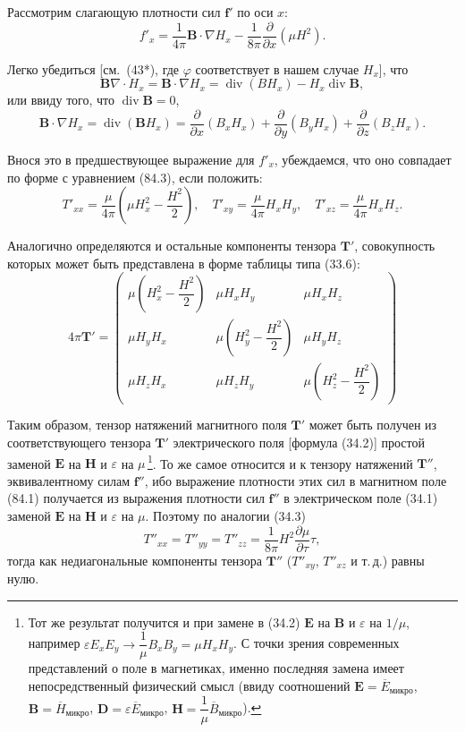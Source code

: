 \documentclass[a4paper,12pt]{article}
\begin{document}
Рассмотрим слагающую плотности сил $\mathbf{f}'$ по оси $x$:
$$
    f'_x = \frac{1}{4\pi}\mathbf{B}\cdot\nabla H_x
         - \frac{1}{8\pi}\frac{\partial}{\partial x}(\mu H^2).
$$

Легко убедиться [см.\ (43*), где $\varphi$ соответствует в нашем случае
$H_x$], что
$$
    \mathbf{B}\nabla\cdot H_x = \mathbf{B}\cdot\nabla H_x
    = \operatorname{div}(BH_x) - H_x\operatorname{div}\mathbf{B},
$$
или ввиду того, что $\operatorname{div}\mathbf{B} = 0$,
$$
    \mathbf{B}\cdot\nabla H_x
    = \operatorname{div}(\mathbf{B}H_x)
    = \frac{\partial}{\partial x}(B_x H_x)
    + \frac{\partial}{\partial y}(B_y H_x)
    + \frac{\partial}{\partial z}(B_z H_x).
$$

Внося это в предшествующее выражение для $f'_x$, убеждаемся, что
оно совпадает по форме с уравнением (84.3), если положить:
$$
    T'_{xx} = \frac{\mu}{4\pi}\!\left(\mu H_x^2 - \frac{H^2}{2}\right),
    \quad
    T'_{xy} = \frac{\mu}{4\pi}H_x H_y,
    \quad
    T'_{xz} = \frac{\mu}{4\pi}H_x H_z.
$$

Аналогично определяются и остальные компоненты тензора $\mathbf{T}'$,
совокупность которых может быть представлена в форме таблицы типа (33.6):
\begin{equation}
    4\pi\mathbf{T}' = \begin{pmatrix}
        \mu\!\left(H_x^2 - \dfrac{H^2}{2}\right) & \mu H_x H_y & \mu H_x H_z \\
        \mu H_y H_x & \mu\!\left(H_y^2 - \dfrac{H^2}{2}\right) & \mu H_y H_z \\
        \mu H_z H_x & \mu H_z H_y & \mu\!\left(H_z^2 - \dfrac{H^2}{2}\right)
    \end{pmatrix}
    \tag{84.4}
\end{equation}


Таким образом, тензор натяжений магнитного поля $\mathbf{T}'$ может быть
получен из соответствующего тензора $\mathbf{T}'$ электрического поля
[формула (34.2)] простой заменой $\mathbf{E}$ на $\mathbf{H}$ и
$\varepsilon$ на $\mu$\,\footnote{Тот же результат получится и при замене
в (34.2) $\mathbf{E}$ на $\mathbf{B}$ и $\varepsilon$ на $1/\mu$,
например $\varepsilon E_x E_y \to \dfrac{1}{\mu}B_x B_y = \mu H_x H_y$.
С точки зрения современных представлений о поле в магнетиках, именно
последняя замена имеет непосредственный физический смысл (ввиду
соотношений $\mathbf{E} = \overline{E}_{\text{микро}}$,
$\mathbf{B} = \overline{H}_{\text{микро}}$,
$\mathbf{D} = \varepsilon\overline{E}_{\text{микро}}$,
$\mathbf{H} = \dfrac{1}{\mu}\overline{B}_{\text{микро}}$).}. То же самое
относится и к тензору натяжений $\mathbf{T}''$, эквивалентному силам
$\mathbf{f}''$, ибо выражение плотности этих сил в магнитном поле (84.1)
получается из выражения плотности сил $\mathbf{f}''$ в электрическом поле
(34.1) заменой $\mathbf{E}$ на $\mathbf{H}$ и $\varepsilon$ на $\mu$.
Поэтому по аналогии (34.3)
\begin{equation}
    T''_{xx} = T''_{yy} = T''_{zz}
             = \frac{1}{8\pi}H^2\frac{\partial\mu}{\partial\tau}\tau,
    \tag{84.5}
\end{equation}
тогда как недиагональные компоненты тензора $\mathbf{T}''$ ($T''_{xy}$,
$T''_{xz}$ и т.\,д.) равны нулю.
\end{document}
